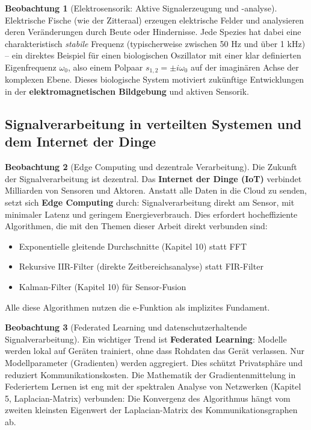 ﻿\documentclass[a4paper,12pt]{report}
\theoremstyle{definition}
\newtheorem{beobachtung}{Beobachtung}
\begin{document}
	\begin{beobachtung}[Elektrosensorik: Aktive Signalerzeugung und -analyse]
		Elektrische Fische (wie der Zitteraal) erzeugen elektrische Felder und analysieren deren Veränderungen durch Beute oder Hindernisse. Jede Spezies hat dabei eine charakteristisch \emph{stabile} Frequenz (typischerweise zwischen 50 Hz und über 1 kHz) -- ein direktes Beispiel für einen biologischen Oszillator mit einer klar definierten Eigenfrequenz $\omega_0$, also einem Polpaar $s_{1,2} = \pm i\omega_0$ auf der imaginären Achse der komplexen Ebene. Dieses biologische System motiviert zukünftige Entwicklungen in der \textbf{elektromagnetischen Bildgebung} und aktiven Sensorik.
	\end{beobachtung}
	
	\subsection{Signalverarbeitung in verteilten Systemen und dem Internet der Dinge}
	
	\begin{beobachtung}[Edge Computing und dezentrale Verarbeitung]
		Die Zukunft der Signalverarbeitung ist dezentral. Das \textbf{Internet der Dinge (IoT)} verbindet Milliarden von Sensoren und Aktoren. Anstatt alle Daten in die Cloud zu senden, setzt sich \textbf{Edge Computing} durch: Signalverarbeitung direkt am Sensor, mit minimaler Latenz und geringem Energieverbrauch. Dies erfordert hocheffiziente Algorithmen, die mit den Themen dieser Arbeit direkt verbunden sind:
		\begin{itemize}
			\item[-] Exponentielle gleitende Durchschnitte (Kapitel 10) statt FFT
			\item[-] Rekursive IIR-Filter (direkte Zeitbereichsanalyse) statt FIR-Filter
			\item[-] Kalman-Filter (Kapitel 10) für Sensor-Fusion
		\end{itemize}
		Alle diese Algorithmen nutzen die e-Funktion als implizites Fundament.
	\end{beobachtung}
	
	\begin{beobachtung}[Federated Learning und datenschutzerhaltende Signalverarbeitung]
		Ein wichtiger Trend ist \textbf{Federated Learning}: Modelle werden lokal auf Geräten trainiert, ohne dass Rohdaten das Gerät verlassen. Nur Modellparameter (Gradienten) werden aggregiert. Dies schützt Privatsphäre und reduziert Kommunikationskosten. Die Mathematik der Gradientenmittelung in Federiertem Lernen ist eng mit der spektralen Analyse von Netzwerken (Kapitel 5, Laplacian-Matrix) verbunden: Die Konvergenz des Algorithmus hängt vom zweiten kleinsten Eigenwert der Laplacian-Matrix des Kommunikationsgraphen ab.
	\end{beobachtung}
	
\end{document}
